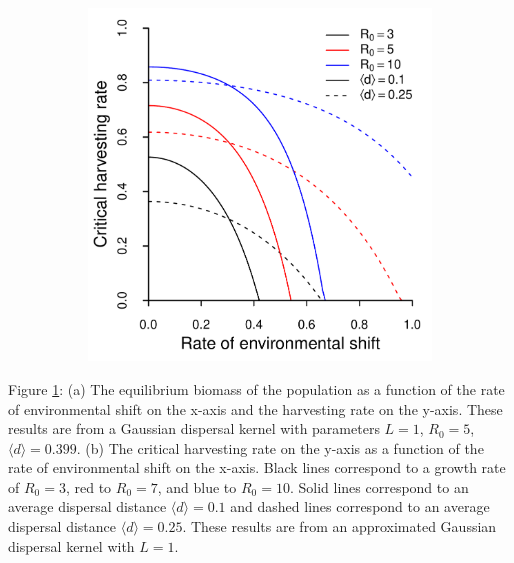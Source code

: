 \documentclass[12pt,english]{article}
\begin{document}
\begin{spacing}{1.9}
\begin{flushleft}
\begin{figure}[htbp]
\begin{subfigure}{3in}
\includegraphics[width=\textwidth]{plots/critical_rates.pdf}
\end{subfigure}
\caption{
}
\label{baseline}
\end{figure}

\pagebreak

Figure \ref{baseline}: (a) The equilibrium biomass of the population as a function of the rate of environmental shift on the x-axis and the harvesting rate on the y-axis. These results are from a Gaussian dispersal kernel with parameters $L=1$, $R_0=5$, $\langle d \rangle = 0.399$.  (b) The critical harvesting rate on the y-axis as a function of the rate of environmental shift on the x-axis.  Black lines correspond to a growth rate of $R_0=3$, red to $R_0=7$, and blue to $R_0=10$.  Solid lines correspond to an average dispersal distance $\langle d \rangle =0.1$ and dashed lines correspond to an average dispersal distance $\langle d \rangle =0.25$.  These results are from an approximated Gaussian dispersal kernel with $L=1$.


\end{flushleft}
\end{spacing}
\end{document}
